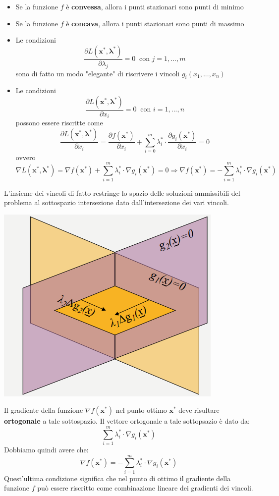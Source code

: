 \documentclass[12pt]{article}
\begin{document}
\begin{itemize}
    \item Se la funzione $f$ è \textbf{convessa}, allora i punti stazionari sono punti di minimo
    \item Se la funzione $f$ è \textbf{concava}, allora i punti stazionari sono punti di massimo
    \item Le condizioni $$\frac{\partial L(\boldsymbol{x}^*, \boldsymbol{\lambda}^*)}{\partial \lambda_j} = 0 \; \; \textrm{con } j = 1,...,m$$ sono di fatto un modo "elegante" di riscrivere i vincoli $g_i(x_1,...,x_n)$
    \item Le condizioni $$\frac{\partial L(\boldsymbol{x}^*, \boldsymbol{\lambda}^*)}{\partial x_i} = 0 \; \; \textrm{con } i = 1,...,n$$ possono essere riscritte come $$\frac{\partial L(\boldsymbol{x}^*, \boldsymbol{\lambda}^*)}{\partial x_i} = \frac{\partial f(\boldsymbol{x}^*)}{\partial x_i} + \sum_{i=0}^{m} \lambda_i^* \cdot \frac{\partial g_i(\boldsymbol{x}^*)}{\partial x_i} = 0$$ ovvero $$\nabla L(\boldsymbol{x}^*, \boldsymbol{\lambda}^*) = \nabla f(\boldsymbol{x}^*) + \sum_{i=1}^{m}\lambda_i^* \cdot \nabla g_i(\boldsymbol{x}^*) = 0 \Rightarrow \nabla f(\boldsymbol{x}^*) = -\sum_{i=1}^{m} \lambda_i^* \cdot \nabla g_i(\boldsymbol{x}^*)$$
\end{itemize}
L'insieme dei vincoli di fatto restringe lo spazio delle soluzioni ammissibili del problema al sottospazio intersezione dato dall'intersezione dei vari vincoli.
\begin{center}
    \includegraphics[width = 0.45\linewidth]{Images/108.PNG}
\end{center}
Il gradiente della funzione $\nabla f(\boldsymbol{x}^*)$ nel punto ottimo $\boldsymbol{x}^*$ deve risultare \textbf{ortogonale} a tale sottospazio.
Il vettore ortogonale a tale sottopsazio è dato da:
$$\sum_{i=1}^{m} \lambda_i^* \cdot \nabla g_i(\boldsymbol{x}^*)$$
Dobbiamo quindi avere che:
$$\nabla f(\boldsymbol{x}^*) = -\sum_{i=1}^{m} \lambda_i^* \cdot \nabla g_i(\boldsymbol{x}^*)$$
Quest'ultima condizione significa che nel punto di ottimo il gradiente della funzione $f$ può essere riscritto come combinazione lineare dei gradienti dei vincoli. \newline
\end{document}

